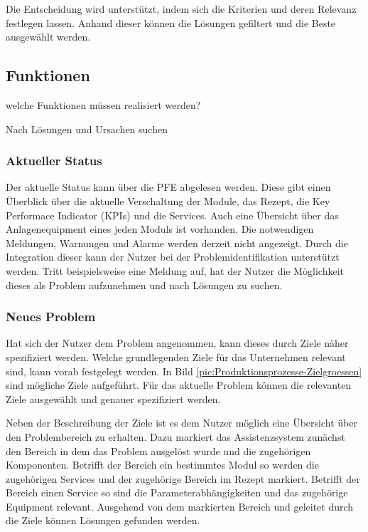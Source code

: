 Die Entscheidung wird unterstützt, indem sich die Kriterien und deren Relevanz festlegen lassen. Anhand dieser können die Lösungen gefiltert und die Beste ausgewählt werden.

\subsection{Funktionen}
welche Funktionen müssen realisiert werden?

Nach Lösungen und Ursachen suchen

\subsubsection*{Aktueller Status}
Der aktuelle Status kann über die PFE abgelesen werden. Diese gibt einen Überblick über die aktuelle Verschaltung der Module, das Rezept, die Key Performace Indicator (KPIs) und die Services. Auch eine Übersicht über das Anlagenequipment eines jeden Moduls ist vorhanden. Die notwendigen Meldungen, Warnungen und Alarme werden derzeit nicht angezeigt. Durch die Integration dieser kann der Nutzer bei der Problemidentifikation unterstützt werden. Tritt beispielsweise eine Meldung auf, hat der Nutzer die Möglichkeit dieses als Problem aufzunehmen und nach Lösungen zu suchen.

\subsubsection*{Neues Problem}
Hat sich der Nutzer dem Problem angenommen, kann dieses durch Ziele näher spezifiziert werden. Welche grundlegenden Ziele für das Unternehmen relevant sind, kann vorab festgelegt werden. In Bild \ref{pic:Produktionsprozesse-Zielgroessen} sind mögliche Ziele aufgeführt. Für das aktuelle Problem können die relevanten Ziele ausgewählt und genauer spezifiziert werden. 

Neben der Beschreibung der Ziele ist es dem Nutzer möglich eine Übersicht über den Problembereich zu erhalten. Dazu markiert das Assistenzsystem zunächst den Bereich in dem das Problem ausgelöst wurde und die zugehörigen Komponenten. Betrifft der Bereich ein bestimmtes Modul so werden die zugehörigen Services und der zugehörige Bereich im Rezept markiert. Betrifft der Bereich einen Service so sind die Parameterabhängigkeiten und das zugehörige Equipment relevant. Ausgehend von dem markierten Bereich und geleitet durch die Ziele können Lösungen gefunden werden.

